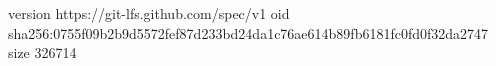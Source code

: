 version https://git-lfs.github.com/spec/v1
oid sha256:0755f09b2b9d5572fef87d233bd24da1c76ae614b89fb6181fc0fd0f32da2747
size 326714
